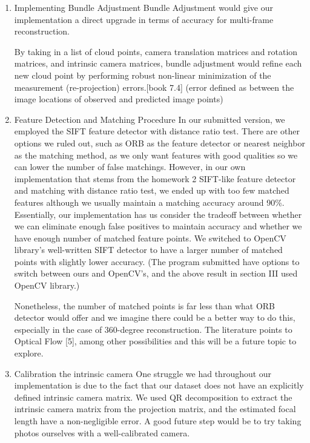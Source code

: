 \documentclass[10pt]{article}
\begin{document}
\begin{enumerate}

\item Implementing Bundle Adjustment
Bundle Adjustment would give our implementation a direct upgrade in terms of accuracy for multi-frame reconstruction. 

By taking in a list of cloud points, camera translation matrices and rotation matrices, and intrinsic camera matrices, bundle adjustment would refine each new cloud point by performing robust non-linear minimization of the measurement (re-projection) errors.[book 7.4] (error defined as between the image locations of observed and predicted image points)

\item Feature Detection and Matching Procedure 
In our submitted version, we employed the SIFT feature detector with distance ratio test. There are other options we ruled out, such as ORB as the feature detector or nearest neighbor as the matching method, as we only want features with good qualities so we can lower the number of false matchings. However, in our own implementation that stems from the homework 2 SIFT-like feature detector and matching with distance ratio test, we ended up with too few matched features although we usually maintain a matching accuracy around 90\%. Essentially, our implementation has us consider the tradeoff between whether we can eliminate enough false positives to maintain accuracy and whether we have enough number of matched feature points. We switched to OpenCV library's well-written SIFT detector to have a larger number of matched points with slightly lower accuracy. (The program submitted have options to switch between ours and OpenCV's, and the above result in section III used OpenCV library.)

Nonetheless, the number of matched points is far less than what ORB detector would offer and we imagine there could be a better way to do this, especially in the case of 360-degree reconstruction. The literature points to Optical Flow [5], among other possibilities and this will be a future topic to explore.

\item Calibration the intrinsic camera
One struggle we had throughout our implementation is due to the fact that our dataset does not have an explicitly defined intrinsic camera matrix. We used QR decomposition to extract the intrinsic camera matrix from the projection matrix, and the estimated focal length have a non-negligible error. A good future step would be to try taking photos ourselves with a well-calibrated camera.
\end{enumerate}
\end{document}

